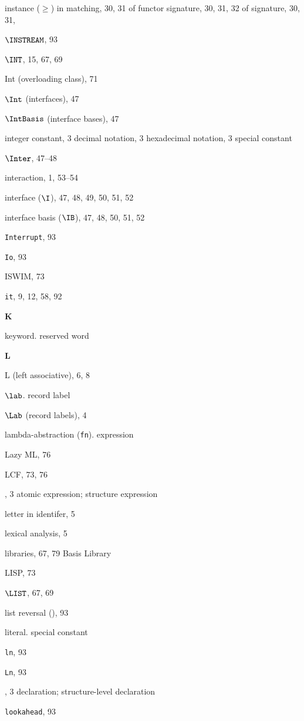 \begin{theindex}
\item instance ($\geq$)
\subitem in matching, 30, 31
\subitem of functor signature, 30, 31, 32
\subitem of signature, 30, 31,
\item $\INSTREAM$, 93
\item $\INT$, 15, 67, 69
\item Int (overloading class), 71
\item $\Int$ (interfaces), 47
\item $\IntBasis$ (interface bases), 47
\item integer constant, 3
\subitem decimal notation, 3
\subitem hexadecimal notation, 3
\subitem \seealso special constant
\item $\Inter$, 47--48
\item interaction, 1, 53--54
\item interface ($\I$), 47, 48, 49, 50, 51, 52
\item interface basis ($\IB$), 47, 48, 50, 51, 52
\item {\tt Interrupt}, 93
\item {\tt Io}, 93
\item ISWIM, 73
\item {\tt it}, 9, 12, 58, 92
\indexspace

\parbox{65mm}{\hfil{\large\bf K}\hfil}

\indexspace
\item keyword. \see reserved word
\indexspace

\parbox{65mm}{\hfil{\large\bf L}\hfil}

\indexspace

\item L (left associative), 6, 8
\item $\lab$. \see record label
\item $\Lab$ (record labels), 4
\item lambda-abstraction ({\tt fn}). \see expression
\item Lazy ML, 76
\item LCF, 73, 76
\item \LET, 3
\subitem \seealso atomic expression; structure expression
\item letter in identifer, 5
\item lexical analysis, 5
\item libraries, 67, 79
\subitem \seealso Basis Library
\item LISP, 73
\item $\LIST$, 67, 69
\item list reversal (), 93
\item literal. \see special constant
\item {\tt ln}, 93
\item {\tt Ln}, 93
\item \LOCAL, 3
\subitem \seealso declaration; structure-level declaration
\item {\tt lookahead}, 93
\indexspace


\end{theindex}
